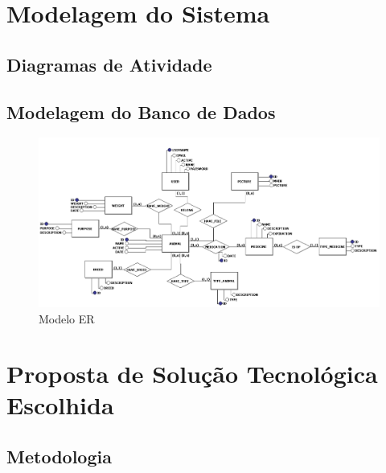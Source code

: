\documentclass[12pt]{article}
\begin{document}
\begin{titlepage}
\begin{figure}[!h]
\begin{center}

\end{center}
\end{figure}


\newpage
\section{Modelagem do Sistema}

\subsection{Diagramas de Atividade}

\subsection{Modelagem do Banco de Dados}

\begin{figure}[!h]
\begin{center}
\caption{Modelo ER}
\includegraphics[width=6in]{img/erdoboi.jpeg}


\end{center}
\end{figure}

\newpage

\section{Proposta de Solução Tecnológica Escolhida}

\subsection{Metodologia}



\end{titlepage}
\end{document}
